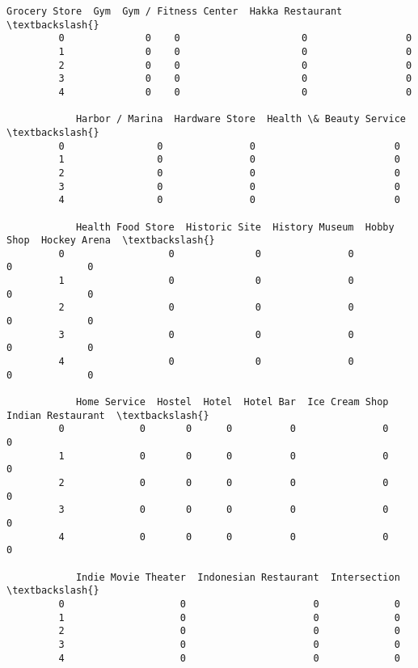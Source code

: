 \documentclass[11pt]{article}
\begin{document}
\begin{Verbatim}[commandchars=\\\{\}]
            Grocery Store  Gym  Gym / Fitness Center  Hakka Restaurant  \textbackslash{}
         0              0    0                     0                 0   
         1              0    0                     0                 0   
         2              0    0                     0                 0   
         3              0    0                     0                 0   
         4              0    0                     0                 0   
         
            Harbor / Marina  Hardware Store  Health \& Beauty Service  \textbackslash{}
         0                0               0                        0   
         1                0               0                        0   
         2                0               0                        0   
         3                0               0                        0   
         4                0               0                        0   
         
            Health Food Store  Historic Site  History Museum  Hobby Shop  Hockey Arena  \textbackslash{}
         0                  0              0               0           0             0   
         1                  0              0               0           0             0   
         2                  0              0               0           0             0   
         3                  0              0               0           0             0   
         4                  0              0               0           0             0   
         
            Home Service  Hostel  Hotel  Hotel Bar  Ice Cream Shop  Indian Restaurant  \textbackslash{}
         0             0       0      0          0               0                  0   
         1             0       0      0          0               0                  0   
         2             0       0      0          0               0                  0   
         3             0       0      0          0               0                  0   
         4             0       0      0          0               0                  0   
         
            Indie Movie Theater  Indonesian Restaurant  Intersection  \textbackslash{}
         0                    0                      0             0   
         1                    0                      0             0   
         2                    0                      0             0   
         3                    0                      0             0   
         4                    0                      0             0   
         

\end{Verbatim}
\end{document}
